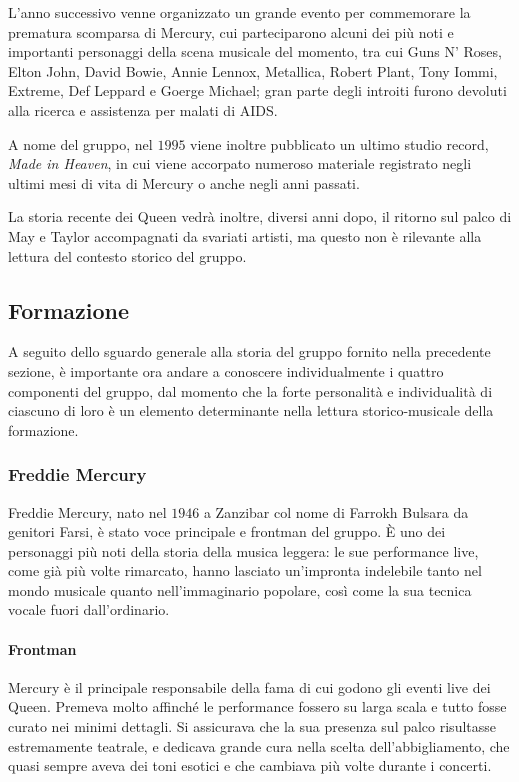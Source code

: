 \documentclass[12pt]{article}
\begin{document}
L'anno successivo venne organizzato un grande evento per commemorare la prematura scomparsa di Mercury, cui parteciparono alcuni dei più noti e importanti personaggi della scena musicale del momento, tra cui Guns N' Roses, Elton John, David Bowie, Annie Lennox, Metallica, Robert Plant, Tony Iommi, Extreme, Def Leppard e Goerge Michael; gran parte degli introiti furono devoluti alla ricerca e assistenza per malati di AIDS.

A nome del gruppo, nel \(1995\) viene inoltre pubblicato un ultimo studio record, \emph{Made in Heaven}, in cui viene accorpato numeroso materiale registrato negli ultimi mesi di vita di Mercury o anche negli anni passati.

La storia recente dei Queen vedrà inoltre, diversi anni dopo, il ritorno sul palco di May e Taylor accompagnati da svariati artisti, ma questo non è rilevante alla lettura del contesto storico del gruppo.

\subsection{Formazione}
A seguito dello sguardo generale alla storia del gruppo fornito nella precedente sezione, è importante ora andare a conoscere individualmente i quattro componenti del gruppo, dal momento che la forte personalità e individualità di ciascuno di loro è un elemento determinante nella lettura storico-musicale della formazione.

\subsubsection{Freddie Mercury}
Freddie Mercury, nato nel \(1946\) a Zanzibar col nome di Farrokh Bulsara da genitori Farsi, è stato voce principale e frontman del gruppo. È uno dei personaggi più noti della storia della musica leggera: le sue performance live, come già più volte rimarcato, hanno lasciato un'impronta indelebile tanto nel mondo musicale quanto nell'immaginario popolare, così come la sua tecnica vocale fuori dall'ordinario.

\paragraph{Frontman}
Mercury è il principale responsabile della fama di cui godono gli eventi live dei Queen. Premeva molto affinché le performance fossero su larga scala e tutto fosse curato nei minimi dettagli. Si assicurava che la sua presenza sul palco risultasse estremamente teatrale, e dedicava grande cura nella scelta dell'abbigliamento, che quasi sempre aveva dei toni esotici e che cambiava più volte durante i concerti.
\end{document}

